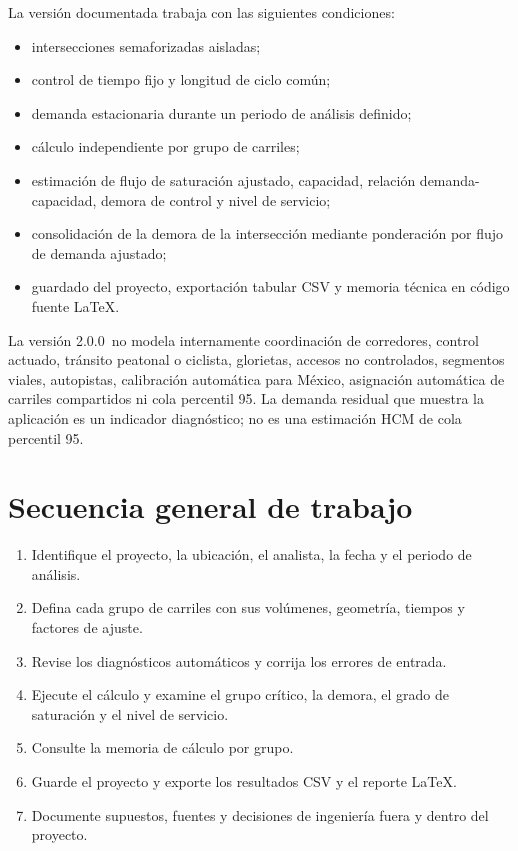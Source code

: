 \documentclass[11pt,letterpaper,oneside,openany]{report}
\newcommand{\softwareVersion}{2.0.0}
\begin{document}
La versión documentada trabaja con las siguientes condiciones:

\begin{itemize}
  \item intersecciones semaforizadas aisladas;
  \item control de tiempo fijo y longitud de ciclo común;
  \item demanda estacionaria durante un periodo de análisis definido;
  \item cálculo independiente por grupo de carriles;
  \item estimación de flujo de saturación ajustado, capacidad, relación
        demanda-capacidad, demora de control y nivel de servicio;
  \item consolidación de la demora de la intersección mediante ponderación por
        flujo de demanda ajustado;
  \item guardado del proyecto, exportación tabular CSV y memoria técnica en
        código fuente LaTeX.
\end{itemize}

\begin{limitbox}
La versión \softwareVersion\ no modela internamente coordinación de corredores,
control actuado, tránsito peatonal o ciclista, glorietas, accesos no controlados,
segmentos viales, autopistas, calibración automática para México, asignación
automática de carriles compartidos ni cola percentil 95. La demanda residual que
muestra la aplicación es un indicador diagnóstico; no es una estimación HCM de
cola percentil 95.
\end{limitbox}

\section{Secuencia general de trabajo}

\begin{procedurebox}
\begin{enumerate}
  \item Identifique el proyecto, la ubicación, el analista, la fecha y el periodo
        de análisis.
  \item Defina cada grupo de carriles con sus volúmenes, geometría, tiempos y
        factores de ajuste.
  \item Revise los diagnósticos automáticos y corrija los errores de entrada.
  \item Ejecute el cálculo y examine el grupo crítico, la demora, el grado de
        saturación y el nivel de servicio.
  \item Consulte la memoria de cálculo por grupo.
  \item Guarde el proyecto y exporte los resultados CSV y el reporte LaTeX.
  \item Documente supuestos, fuentes y decisiones de ingeniería fuera y dentro
        del proyecto.
\end{enumerate}
\end{procedurebox}
\end{document}
